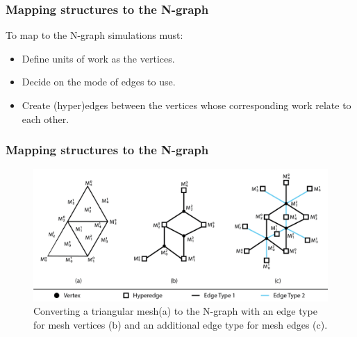 \documentclass{beamer}
\begin{document}
\begin{frame}
  \frametitle{Mapping structures to the N-graph}
  To map to the N-graph simulations must:
  \begin{itemize}
  \item Define units of work as the vertices.
  \item Decide on the mode of edges to use.
  \item Create (hyper)edges between the vertices whose corresponding work relate to each other.
  \end{itemize}
\end{frame}
\begin{frame}
  \frametitle{Mapping structures to the N-graph}

  \begin{figure}
    \centering
    \includegraphics[width=.9\textwidth]{figures/exampleMesh2Graph.png}
    \caption{Converting a triangular mesh(a) to the N-graph with an edge type for mesh vertices (b) and an additional edge type for mesh edges (c).}
  \end{figure}
\end{frame}
\end{document}
